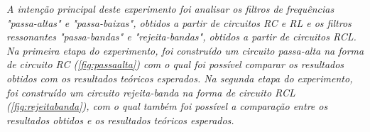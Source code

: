 \textit{A intenção principal deste experimento foi analisar os filtros de frequências "passa-altas" e "passa-baixas", obtidos a partir de circuitos RC e RL e os filtros ressonantes "passa-bandas" e "rejeita-bandas", obtidos a partir de circuitos RCL. 
Na primeira etapa do experimento, foi construído um circuito passa-alta na forma de circuito RC (\cref{fig:passaalta}) com o qual foi possível comparar os resultados obtidos com os resultados teóricos esperados.
Na segunda etapa do experimento, foi construído um circuito rejeita-banda na forma de circuito RCL (\cref{fig:rejeitabanda}), com o qual também foi possível a comparação entre os resultados obtidos e os resultados teóricos esperados.}